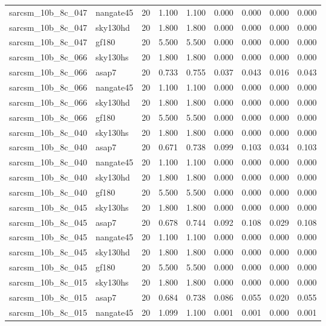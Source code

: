 \begin{tabular}{llrrrrrrr}
sarcsm\_10b\_8c\_047 & nangate45 & 20 & 1.100 & 1.100 & 0.000 & 0.000 & 0.000 & 0.000 \\
sarcsm\_10b\_8c\_047 & sky130hd & 20 & 1.800 & 1.800 & 0.000 & 0.000 & 0.000 & 0.000 \\
sarcsm\_10b\_8c\_047 & gf180 & 20 & 5.500 & 5.500 & 0.000 & 0.000 & 0.000 & 0.000 \\
sarcsm\_10b\_8c\_066 & sky130hs & 20 & 1.800 & 1.800 & 0.000 & 0.000 & 0.000 & 0.000 \\
sarcsm\_10b\_8c\_066 & asap7 & 20 & 0.733 & 0.755 & 0.037 & 0.043 & 0.016 & 0.043 \\
sarcsm\_10b\_8c\_066 & nangate45 & 20 & 1.100 & 1.100 & 0.000 & 0.000 & 0.000 & 0.000 \\
sarcsm\_10b\_8c\_066 & sky130hd & 20 & 1.800 & 1.800 & 0.000 & 0.000 & 0.000 & 0.000 \\
sarcsm\_10b\_8c\_066 & gf180 & 20 & 5.500 & 5.500 & 0.000 & 0.000 & 0.000 & 0.000 \\
sarcsm\_10b\_8c\_040 & sky130hs & 20 & 1.800 & 1.800 & 0.000 & 0.000 & 0.000 & 0.000 \\
sarcsm\_10b\_8c\_040 & asap7 & 20 & 0.671 & 0.738 & 0.099 & 0.103 & 0.034 & 0.103 \\
sarcsm\_10b\_8c\_040 & nangate45 & 20 & 1.100 & 1.100 & 0.000 & 0.000 & 0.000 & 0.000 \\
sarcsm\_10b\_8c\_040 & sky130hd & 20 & 1.800 & 1.800 & 0.000 & 0.000 & 0.000 & 0.000 \\
sarcsm\_10b\_8c\_040 & gf180 & 20 & 5.500 & 5.500 & 0.000 & 0.000 & 0.000 & 0.000 \\
sarcsm\_10b\_8c\_045 & sky130hs & 20 & 1.800 & 1.800 & 0.000 & 0.000 & 0.000 & 0.000 \\
sarcsm\_10b\_8c\_045 & asap7 & 20 & 0.678 & 0.744 & 0.092 & 0.108 & 0.029 & 0.108 \\
sarcsm\_10b\_8c\_045 & nangate45 & 20 & 1.100 & 1.100 & 0.000 & 0.000 & 0.000 & 0.000 \\
sarcsm\_10b\_8c\_045 & sky130hd & 20 & 1.800 & 1.800 & 0.000 & 0.000 & 0.000 & 0.000 \\
sarcsm\_10b\_8c\_045 & gf180 & 20 & 5.500 & 5.500 & 0.000 & 0.000 & 0.000 & 0.000 \\
sarcsm\_10b\_8c\_015 & sky130hs & 20 & 1.800 & 1.800 & 0.000 & 0.000 & 0.000 & 0.000 \\
sarcsm\_10b\_8c\_015 & asap7 & 20 & 0.684 & 0.738 & 0.086 & 0.055 & 0.020 & 0.055 \\
sarcsm\_10b\_8c\_015 & nangate45 & 20 & 1.099 & 1.100 & 0.001 & 0.001 & 0.000 & 0.001 \\

\end{tabular}
